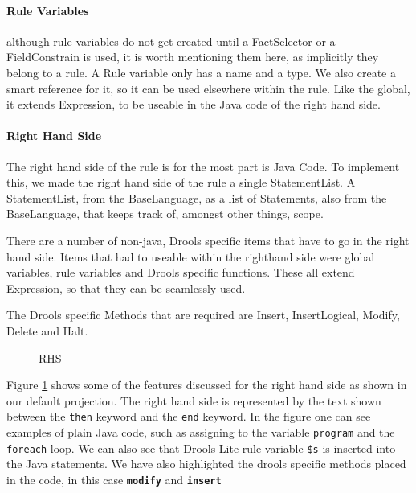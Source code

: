 \paragraph{Rule Variables} although rule variables do not get created until a FactSelector or a FieldConstrain is used, it is worth mentioning them here, as implicitly they belong to a rule.
A Rule variable only has a name and a type.
We also create a smart reference for it, so it can be used elsewhere within the rule.
Like the global, it extends Expression, to be useable in the Java code of the right hand side.

\paragraph{Right Hand Side}
The right hand side of the rule is for the most part is Java Code.  
To implement this, we made the right hand side of the rule a single StatementList.
A StatementList, from the BaseLanguage, as a list of Statements, also from the BaseLanguage, that keeps track of, amongst other things, scope.

There are a number of non-java, Drools specific items that have to go in the right hand side.
Items that had to useable within the righthand side were global variables, rule variables and Drools specific functions.
These all extend Expression, so that they can be seamlessly used.

The Drools specific Methods that are required are Insert, InsertLogical, Modify, Delete and Halt.

\begin{figure}[!h]
    \centering
    \caption{RHS}
    \label{fig:RHS}
\end{figure}

Figure \ref{fig:RHS} shows some of the features discussed for the right hand side as shown in our default projection.
The right hand side is represented by the text shown between the \texttt{then} keyword and the \texttt{end} keyword.
In the figure one can see examples of plain Java code, such as assigning to the variable \texttt{program} and the \texttt{foreach} loop.
We can also see that Drools-Lite rule variable \texttt{\$s} is inserted into the Java statements.
We have also highlighted the drools specific methods placed in the code, in this case \texttt{\textbf{modify}} and \texttt{\textbf{insert}}   

